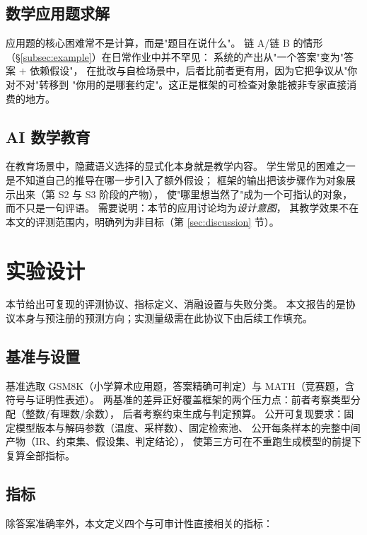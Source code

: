 \documentclass[11pt]{article}
\begin{document}
\subsection{数学应用题求解}
应用题的核心困难常不是计算，而是"题目在说什么"。
链 A/链 B 的情形（\S\ref{subsec:example}）在日常作业中并不罕见：
系统的产出从"一个答案"变为"答案 $+$ 依赖假设"，
在批改与自检场景中，后者比前者更有用，因为它把争议从"你对不对"转移到
"你用的是哪套约定"。这正是框架的可检查对象能被非专家直接消费的地方。

\subsection{AI 数学教育}
在教育场景中，隐藏语义选择的显式化本身就是教学内容。
学生常见的困难之一是不知道自己的推导在哪一步引入了额外假设；
框架的输出把该步骤作为对象展示出来（第 S2 与 S3 阶段的产物），
使"哪里想当然了"成为一个可指认的对象，而不只是一句评语。
需要说明：本节的应用讨论均为\emph{设计意图}，
其教学效果不在本文的评测范围内，明确列为非目标（第 \ref{sec:discussion} 节）。

\section{实验设计}
\label{sec:experiment}
本节给出可复现的评测协议、指标定义、消融设置与失败分类。
本文报告的是协议本身与预注册的预测方向；实测量级需在此协议下由后续工作填充。

\subsection{基准与设置}
基准选取 GSM8K\cite{cobbe2021gsm8k}（小学算术应用题，答案精确可判定）与
MATH\cite{hendrycks2021math}（竞赛题，含符号与证明性表述）。
两基准的差异正好覆盖框架的两个压力点：前者考察类型分配（整数/有理数/余数），
后者考察约束生成与判定预算。
公开可复现要求：固定模型版本与解码参数（温度、采样数）、固定检索池、
公开每条样本的完整中间产物（IR、约束集、假设集、判定结论），
使第三方可在不重跑生成模型的前提下复算全部指标。

\subsection{指标}
除答案准确率外，本文定义四个与可审计性直接相关的指标：
\end{document}
